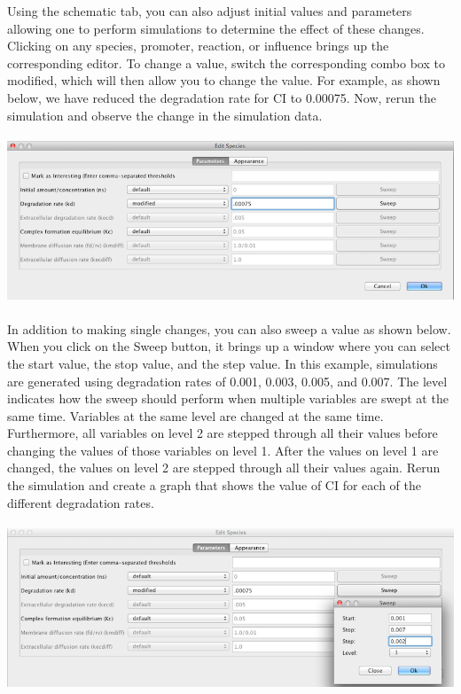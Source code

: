 \documentclass[titlepage,11pt]{article}
\begin{document}
Using the schematic tab, you can also adjust initial values and parameters allowing one to perform simulations to determine the effect of these changes.  Clicking on any species, promoter, reaction, or influence brings up the corresponding editor.  To change a value, switch the corresponding combo box to modified, which will then allow you to change the value.  For example, as shown below, we have reduced the degradation rate for CI to 0.00075.  Now, rerun the simulation and observe the change in the simulation data.

\begin{center}
\includegraphics[height=50mm]{screenshots/paramEdit}
\end{center}

In addition to making single changes, you can also sweep a value as shown below.   When you click on the Sweep button, it brings up a window where you can select the start value, the stop value, and the step value.  In this example, simulations are generated using degradation rates of 0.001, 0.003, 0.005, and 0.007.  The level indicates how the sweep should perform when multiple variables are swept at the same time.  Variables at the same level are changed at the same time.  Furthermore, all variables on level 2 are stepped through all their values before changing the values of those variables on level 1.  After the values on level 1 are changed, the values on level 2 are stepped through all their values again.  Rerun the simulation and create a graph that shows the value of CI for each of the different degradation rates.

\begin{center}
\includegraphics[height=50mm]{screenshots/sweep}
\end{center}
\end{document}
